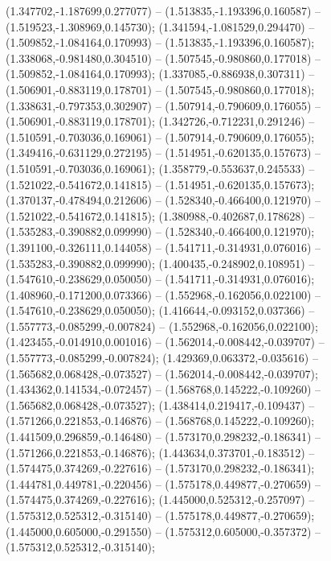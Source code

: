  (1.347702,-1.187699,0.277077) -- (1.513835,-1.193396,0.160587) -- (1.519523,-1.308969,0.145730);
 (1.341594,-1.081529,0.294470) -- (1.509852,-1.084164,0.170993) -- (1.513835,-1.193396,0.160587);
 (1.338068,-0.981480,0.304510) -- (1.507545,-0.980860,0.177018) -- (1.509852,-1.084164,0.170993);
 (1.337085,-0.886938,0.307311) -- (1.506901,-0.883119,0.178701) -- (1.507545,-0.980860,0.177018);
 (1.338631,-0.797353,0.302907) -- (1.507914,-0.790609,0.176055) -- (1.506901,-0.883119,0.178701);
 (1.342726,-0.712231,0.291246) -- (1.510591,-0.703036,0.169061) -- (1.507914,-0.790609,0.176055);
 (1.349416,-0.631129,0.272195) -- (1.514951,-0.620135,0.157673) -- (1.510591,-0.703036,0.169061);
 (1.358779,-0.553637,0.245533) -- (1.521022,-0.541672,0.141815) -- (1.514951,-0.620135,0.157673);
 (1.370137,-0.478494,0.212606) -- (1.528340,-0.466400,0.121970) -- (1.521022,-0.541672,0.141815);
 (1.380988,-0.402687,0.178628) -- (1.535283,-0.390882,0.099990) -- (1.528340,-0.466400,0.121970);
 (1.391100,-0.326111,0.144058) -- (1.541711,-0.314931,0.076016) -- (1.535283,-0.390882,0.099990);
 (1.400435,-0.248902,0.108951) -- (1.547610,-0.238629,0.050050) -- (1.541711,-0.314931,0.076016);
 (1.408960,-0.171200,0.073366) -- (1.552968,-0.162056,0.022100) -- (1.547610,-0.238629,0.050050);
 (1.416644,-0.093152,0.037366) -- (1.557773,-0.085299,-0.007824) -- (1.552968,-0.162056,0.022100);
 (1.423455,-0.014910,0.001016) -- (1.562014,-0.008442,-0.039707) -- (1.557773,-0.085299,-0.007824);
 (1.429369,0.063372,-0.035616) -- (1.565682,0.068428,-0.073527) -- (1.562014,-0.008442,-0.039707);
 (1.434362,0.141534,-0.072457) -- (1.568768,0.145222,-0.109260) -- (1.565682,0.068428,-0.073527);
 (1.438414,0.219417,-0.109437) -- (1.571266,0.221853,-0.146876) -- (1.568768,0.145222,-0.109260);
 (1.441509,0.296859,-0.146480) -- (1.573170,0.298232,-0.186341) -- (1.571266,0.221853,-0.146876);
 (1.443634,0.373701,-0.183512) -- (1.574475,0.374269,-0.227616) -- (1.573170,0.298232,-0.186341);
 (1.444781,0.449781,-0.220456) -- (1.575178,0.449877,-0.270659) -- (1.574475,0.374269,-0.227616);
 (1.445000,0.525312,-0.257097) -- (1.575312,0.525312,-0.315140) -- (1.575178,0.449877,-0.270659);
 (1.445000,0.605000,-0.291550) -- (1.575312,0.605000,-0.357372) -- (1.575312,0.525312,-0.315140);
